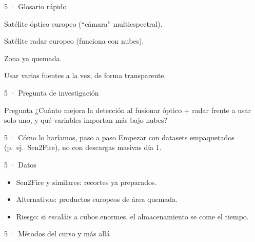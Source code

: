 \begin{frame}{5 · Glosario rápido}
  \begin{description}[font=\bfseries\scriptsize,style=nextline,leftmargin=1.8cm]
    \item[Sentinel-2] Satélite óptico europeo (``cámara'' multiespectral).
    \item[Sentinel-1] Satélite radar europeo (funciona con nubes).
    \item[Burnt area] Zona ya quemada.
    \item[Fusión] Usar varias fuentes a la vez, de forma transparente.
  \end{description}
\end{frame}

\begin{frame}{5 · Pregunta de investigación}
  \begin{block}{Pregunta}
    ¿Cuánto mejora la detección al fusionar óptico + radar frente a usar solo uno, y qué variables importan más bajo nubes?
  \end{block}
\end{frame}

\begin{frame}{5 · Cómo lo haríamos, paso a paso}
  \vspace{0.3em}
  Empezar con datasets empaquetados (p.\ ej.\ Sen2Fire), no con descargas masivas día 1.
\end{frame}

\begin{frame}{5 · Datos}
  \begin{itemize}
    \item Sen2Fire y similares: recortes ya preparados.
    \item Alternativas: productos europeos de área quemada.
    \item Riesgo: si escaláis a cubos enormes, el almacenamiento se come el tiempo.
  \end{itemize}
\end{frame}

\begin{frame}{5 · Métodos del curso y más allá}
\end{frame}

